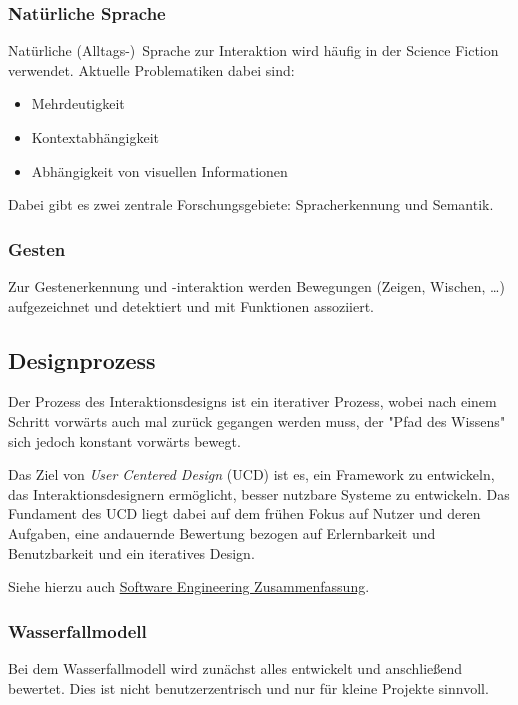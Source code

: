 \documentclass[a4paper, 11pt, accentcolor = tud3b]{tudreport}
\begin{document}
				\subsubsection{Natürliche Sprache}
					Natürliche (Alltags-)~Sprache zur Interaktion wird häufig in der Science Fiction verwendet. Aktuelle Problematiken dabei sind:
					\begin{itemize}
						\item Mehrdeutigkeit
						\item Kontextabhängigkeit
						\item Abhängigkeit von visuellen Informationen
					\end{itemize}
					Dabei gibt es zwei zentrale Forschungsgebiete: Spracherkennung und Semantik.

				\subsubsection{Gesten}
					Zur Gestenerkennung und -interaktion werden Bewegungen (Zeigen, Wischen, \dots) aufgezeichnet und detektiert und mit Funktionen assoziiert.

			\subsection{Designprozess}
				Der Prozess des Interaktionsdesigns ist ein iterativer Prozess, wobei nach einem Schritt vorwärts auch mal zurück gegangen werden muss, der "Pfad des Wissens" sich jedoch konstant vorwärts bewegt.
				
				Das Ziel von \emph{User Centered Design} (UCD) ist es, ein Framework zu entwickeln, das Interaktionsdesignern ermöglicht, besser nutzbare Systeme zu entwickeln. Das Fundament des UCD liegt dabei auf dem frühen Fokus auf Nutzer und deren Aufgaben, eine andauernde Bewertung bezogen auf Erlernbarkeit und Benutzbarkeit und ein iteratives Design.
				
				Siehe hierzu auch \href{https://projects.frisp.org/documents/12}{Software Engineering Zusammenfassung}.

				\subsubsection{Wasserfallmodell}
					Bei dem Wasserfallmodell wird zunächst alles entwickelt und anschließend bewertet. Dies ist nicht benutzerzentrisch und nur für kleine Projekte sinnvoll.
\end{document}
